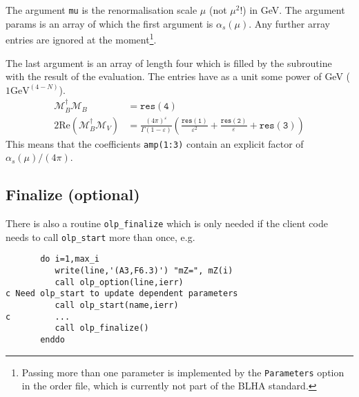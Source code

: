 The argument \texttt{mu} is the renormalisation scale $\mu$ (not $\mu^2$!)
in GeV. The argument params is an array of which the first argument is
$\alpha_s(\mu)$. Any further array entries are ignored at the moment\footnote{
Passing more than one parameter is implemented by the \texttt{Parameters}
option in the order file, which is currently not part of the BLHA standard.}.

The last argument is an array of length four which is filled by the subroutine
with the result of the evaluation. The entries have as a unit some
power of GeV ($1\text{GeV}^(4-N)$).
\begin{align}
\mathcal{M}_B^\dagger\mathcal{M}_B&=\mathtt{res(4)}\\
2\mathrm{Re}\left(\mathcal{M}_B^\dagger\mathcal{M}_V\right)&=
\frac{(4\pi)^\varepsilon}{\Gamma(1-\varepsilon)}\left(
\frac{\mathtt{res(1)}}{\varepsilon^2}
+\frac{\mathtt{res(2)}}{\varepsilon}
+\mathtt{res(3)}
\right)
\end{align}
This means that the coefficients \texttt{amp(1:3)} contain
an explicit factor of $\alpha_s(\mu)/(4\pi)$.

\subsection{Finalize (optional)}
There is also a routine \texttt{olp\_finalize} which is only needed
if the client code needs to call \texttt{olp\_start} more than once, e.g.
\begin{lstlisting}
       do i=1,max_i
          write(line,'(A3,F6.3)') "mZ=", mZ(i)
          call olp_option(line,ierr)
c Need olp_start to update dependent parameters
          call olp_start(name,ierr)
c         ...
          call olp_finalize()
       enddo
\end{lstlisting}

%
